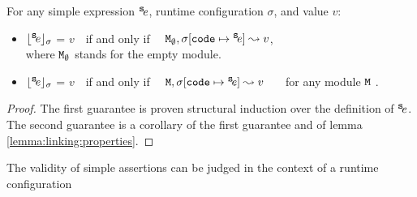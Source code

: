 \begin{lemma}
For any simple expression ${^{\small{{\mbox{\tt{s}}}}}\!e}$, runtime configuration $\sigma$, and value $v$:

\begin{itemize}
     \item 
  ${\lfloor{ {\ensuremath{{^{\small{{\mbox{\tt{s}}}}}\!e}}}}\rfloor_{\sigma}}$ = $v$\ \     if and only if \ \ ${\mbox{\tt{M}}}_\emptyset, \sigma[{\mbox{\tt{code}}}\mapsto {^{\small{{\mbox{\tt{s}}}}}\!e}] \leadsto v$,\\
  where ${\mbox{\tt{M}}}_\emptyset$ stands for the empty module.
  \item
   ${\lfloor{ {\ensuremath{{^{\small{{\mbox{\tt{s}}}}}\!e}}}}\rfloor_{\sigma}}$ = $v$\ \     if and only if \ \ ${\mbox{\tt{M}}}, \sigma[{\mbox{\tt{code}}}\mapsto {^{\small{{\mbox{\tt{s}}}}}\!e}] \leadsto v$ \ \ \ for any module ${\mbox{\tt{M}}}$ .
   \end{itemize}
   \end{lemma}
   
   \begin{proof} The  first guarantee is proven structural induction  over the definition of ${^{\small{{\mbox{\tt{s}}}}}\!e}$.
   The second guarantee  is a corollary of the first guarantee  and of lemma \ref{lemma:linking:properties}.\end{proof}


The validity of simple assertions can be judged in the context of a runtime configuration

